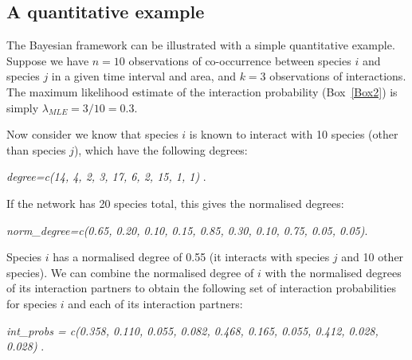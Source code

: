 \documentclass[12pt]{article}
\begin{document}
\begin{spacing}{2.0}
\section*{A quantitative example}

  The Bayesian framework can be illustrated with a simple quantitative example. Suppose we have $n = 10$ observations of co-occurrence between species $i$ and species $j$ in a given time interval and area, and $k = 3$ observations of interactions. The maximum likelihood estimate of the interaction probability (Box~\ref{Box2}) is simply $\lambda_{MLE} = 3/10 = 0.3$. 
  

  Now consider we know that species $i$ is known to interact with 10 species (other than species $j$), which have the following degrees:

    \vspace{12pt}
    \noindent\emph{
      degree=c(14, 4, 2, 3, 17, 6, 2, 15, 1, 1)
        }.
      \vspace{12pt}

    If the network has 20 species total, this gives the normalised degrees:

    \vspace{12pt}
    \noindent\emph{
      norm\_degree=c(0.65, 0.20, 0.10, 0.15, 0.85, 0.30, 0.10, 0.75, 0.05, 0.05)}.
      \vspace{12pt}

    Species $i$ has a normalised degree of 0.55 (it interacts with species $j$ and 10 other species). We can combine the normalised degree of $i$ with the normalised degrees of its interaction partners to obtain the following set of interaction probabilities for species $i$ and each of its interaction partners:

    \vspace{12pt}
    \noindent\emph{
       int\_probs = c(0.358, 0.110, 0.055, 0.082, 0.468, 0.165, 0.055, 0.412, 0.028, 0.028) }.
      \vspace{12pt}


\end{spacing}
\end{document}
